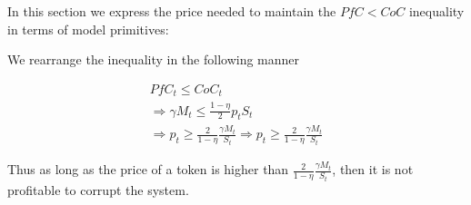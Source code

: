 
In this section we express the price needed to maintain the $PfC < CoC$ inequality in terms of
model primitives:

We rearrange the inequality in the following manner

\begin{align*}
  PfC_t \leq CoC_t \\
  \Rightarrow \gamma M_t \leq \frac{1 - \eta}{2} p_t S_t \\
  \Rightarrow p_t \geq \frac{2}{1 - \eta} \frac{\gamma M_t}{S_t}
  \Rightarrow p_t \geq \frac{2}{1 - \eta} \frac{\gamma M_t}{S_t}
\end{align*}

Thus as long as the price of a token is higher than $\frac{2}{1 - \eta} \frac{\gamma M_t}{S_t}$,
then it is not profitable to corrupt the system.
